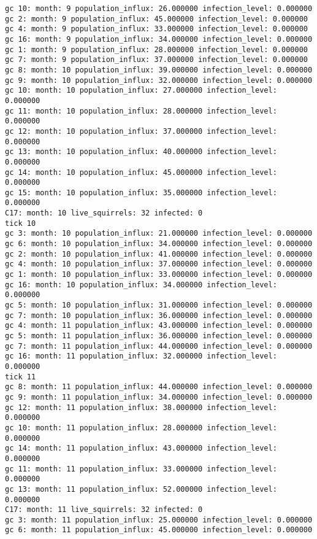 \begin{lstlisting}[basicstyle=\small]
gc 10: month: 9 population_influx: 26.000000 infection_level: 0.000000
gc 2: month: 9 population_influx: 45.000000 infection_level: 0.000000
gc 4: month: 9 population_influx: 33.000000 infection_level: 0.000000
gc 16: month: 9 population_influx: 34.000000 infection_level: 0.000000
gc 1: month: 9 population_influx: 28.000000 infection_level: 0.000000
gc 7: month: 9 population_influx: 37.000000 infection_level: 0.000000
gc 8: month: 10 population_influx: 39.000000 infection_level: 0.000000
gc 9: month: 10 population_influx: 32.000000 infection_level: 0.000000
gc 10: month: 10 population_influx: 27.000000 infection_level: 0.000000
gc 11: month: 10 population_influx: 28.000000 infection_level: 0.000000
gc 12: month: 10 population_influx: 37.000000 infection_level: 0.000000
gc 13: month: 10 population_influx: 40.000000 infection_level: 0.000000
gc 14: month: 10 population_influx: 45.000000 infection_level: 0.000000
gc 15: month: 10 population_influx: 35.000000 infection_level: 0.000000
C17: month: 10 live_squirrels: 32 infected: 0
tick 10
gc 3: month: 10 population_influx: 21.000000 infection_level: 0.000000
gc 6: month: 10 population_influx: 34.000000 infection_level: 0.000000
gc 2: month: 10 population_influx: 41.000000 infection_level: 0.000000
gc 4: month: 10 population_influx: 37.000000 infection_level: 0.000000
gc 1: month: 10 population_influx: 33.000000 infection_level: 0.000000
gc 16: month: 10 population_influx: 34.000000 infection_level: 0.000000
gc 5: month: 10 population_influx: 31.000000 infection_level: 0.000000
gc 7: month: 10 population_influx: 36.000000 infection_level: 0.000000
gc 4: month: 11 population_influx: 43.000000 infection_level: 0.000000
gc 5: month: 11 population_influx: 36.000000 infection_level: 0.000000
gc 7: month: 11 population_influx: 44.000000 infection_level: 0.000000
gc 16: month: 11 population_influx: 32.000000 infection_level: 0.000000
tick 11
gc 8: month: 11 population_influx: 44.000000 infection_level: 0.000000
gc 9: month: 11 population_influx: 34.000000 infection_level: 0.000000
gc 12: month: 11 population_influx: 38.000000 infection_level: 0.000000
gc 10: month: 11 population_influx: 28.000000 infection_level: 0.000000
gc 14: month: 11 population_influx: 43.000000 infection_level: 0.000000
gc 11: month: 11 population_influx: 33.000000 infection_level: 0.000000
gc 13: month: 11 population_influx: 52.000000 infection_level: 0.000000
C17: month: 11 live_squirrels: 32 infected: 0
gc 3: month: 11 population_influx: 25.000000 infection_level: 0.000000
gc 6: month: 11 population_influx: 45.000000 infection_level: 0.000000

\end{lstlisting}
